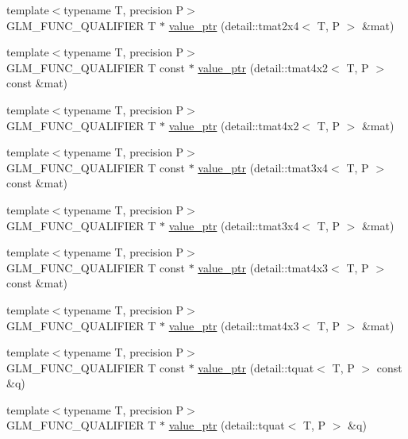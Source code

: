 \begin{CompactItemize}
\item 
{\footnotesize template$<$typename T, precision P$>$ }\\GLM\_\-FUNC\_\-QUALIFIER T $\ast$ \hyperlink{group__gtc__type__ptr_g998aae25d0d9de346b951148c61e930e}{value\_\-ptr} (detail::tmat2x4$<$ T, P $>$ \&mat)
\item 
{\footnotesize template$<$typename T, precision P$>$ }\\GLM\_\-FUNC\_\-QUALIFIER T const $\ast$ \hyperlink{group__gtc__type__ptr_g548aa4697fc58fdd3d33df6c57777191}{value\_\-ptr} (detail::tmat4x2$<$ T, P $>$ const \&mat)
\item 
{\footnotesize template$<$typename T, precision P$>$ }\\GLM\_\-FUNC\_\-QUALIFIER T $\ast$ \hyperlink{group__gtc__type__ptr_gcf65ffcdfc741ebebedfc7a50e2bde7f}{value\_\-ptr} (detail::tmat4x2$<$ T, P $>$ \&mat)
\item 
{\footnotesize template$<$typename T, precision P$>$ }\\GLM\_\-FUNC\_\-QUALIFIER T const $\ast$ \hyperlink{group__gtc__type__ptr_g7ac16d67cf7bb44cb53bc7e6a7c8bd2c}{value\_\-ptr} (detail::tmat3x4$<$ T, P $>$ const \&mat)
\item 
{\footnotesize template$<$typename T, precision P$>$ }\\GLM\_\-FUNC\_\-QUALIFIER T $\ast$ \hyperlink{group__gtc__type__ptr_gf7f8f1087650774da27f31c99175cfeb}{value\_\-ptr} (detail::tmat3x4$<$ T, P $>$ \&mat)
\item 
{\footnotesize template$<$typename T, precision P$>$ }\\GLM\_\-FUNC\_\-QUALIFIER T const $\ast$ \hyperlink{group__gtc__type__ptr_g7c8877c9dc37f2229d4b75fd735be5d5}{value\_\-ptr} (detail::tmat4x3$<$ T, P $>$ const \&mat)
\item 
{\footnotesize template$<$typename T, precision P$>$ }\\GLM\_\-FUNC\_\-QUALIFIER T $\ast$ \hyperlink{group__gtc__type__ptr_g1ba54cb6c4ff3c61c27f4883bddf6d31}{value\_\-ptr} (detail::tmat4x3$<$ T, P $>$ \&mat)
\item 
{\footnotesize template$<$typename T, precision P$>$ }\\GLM\_\-FUNC\_\-QUALIFIER T const $\ast$ \hyperlink{group__gtc__type__ptr_g06ca6cd0663b5a1ed1c217efc80013d8}{value\_\-ptr} (detail::tquat$<$ T, P $>$ const \&q)
\item 
{\footnotesize template$<$typename T, precision P$>$ }\\GLM\_\-FUNC\_\-QUALIFIER T $\ast$ \hyperlink{group__gtc__type__ptr_ga84b8d637d0b816514e2db6ce19cec6c}{value\_\-ptr} (detail::tquat$<$ T, P $>$ \&q)

\end{CompactItemize}
